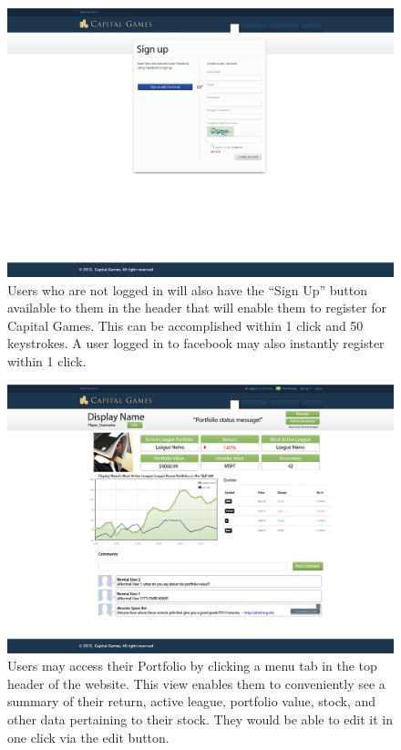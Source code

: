 {
\begin{figure}
\centering
\includegraphics[width=5.5in]{./mockups/JPEG/Register.jpg}
\caption{Users who are not logged in will also have the ``Sign Up'' button available to them in the header that will enable them to register for Capital Games. This can be accomplished within 1 click and 50 keystrokes. A user logged in to facebook may also instantly register within 1 click.}
\end{figure}
}


{
\begin{figure}
\centering
\includegraphics[width=5.5in]{./mockups/JPEG/Portfolio.jpg}
\caption{Users may access their Portfolio by clicking a menu tab in the top header of the website. This view enables them to conveniently see a summary of their return, active league, portfolio value, stock, and other data pertaining to their stock. They would be able to edit it in one click via the edit button. }
\end{figure}
}


